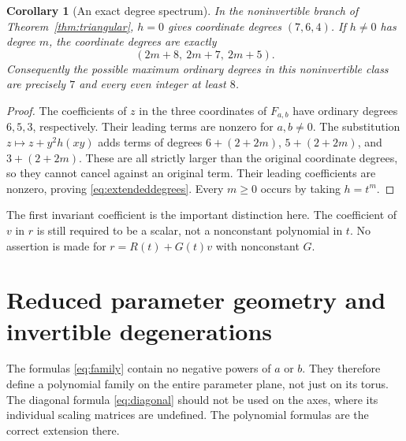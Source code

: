 \documentclass[11pt,a4paper]{article}
\numberwithin{equation}{section}
\newtheorem{corollary}[theorem]{Corollary}
\theoremstyle{definition}
\theoremstyle{remark}
\begin{document}
\begin{corollary}[An exact degree spectrum]\label{cor:degreespectrum}
In the noninvertible branch of Theorem~\ref{thm:triangular}, $h=0$ gives
coordinate degrees $(7,6,4)$. If $h\ne0$ has degree $m$, the coordinate
degrees are exactly
\begin{equation}\label{eq:extendeddegrees}
(2m+8,\ 2m+7,\ 2m+5).
\end{equation}
Consequently the possible maximum ordinary degrees in this noninvertible
class are precisely $7$ and every even integer at least $8$.
\end{corollary}
\begin{proof}
The coefficients of $z$ in the three coordinates of $F_{a,b}$ have
ordinary degrees $6,5,3$, respectively. Their leading terms are nonzero
for $a,b\ne0$. The substitution $z\mapsto z+y^2h(xy)$ adds terms of
degrees $6+(2+2m)$, $5+(2+2m)$, and $3+(2+2m)$. These are all strictly
larger than the original coordinate degrees, so they cannot cancel against
an original term. Their leading coefficients are nonzero, proving
\eqref{eq:extendeddegrees}. Every $m\ge0$ occurs by taking $h=t^m$.
\end{proof}

The first invariant coefficient is the important distinction here. The
coefficient of $v$ in $r$ is still required to be a scalar, not a
nonconstant polynomial in $t$. No assertion is made for
$r=R(t)+G(t)v$ with nonconstant $G$.

\section{Reduced parameter geometry and invertible degenerations}
\label{sec:geometry}

The formulas \eqref{eq:family} contain no negative powers of $a$ or $b$.
They therefore define a polynomial family on the entire parameter plane,
not just on its torus. The diagonal formula \eqref{eq:diagonal} should not
be used on the axes, where its individual scaling matrices are undefined.
The polynomial formulas are the correct extension there.
\end{document}
